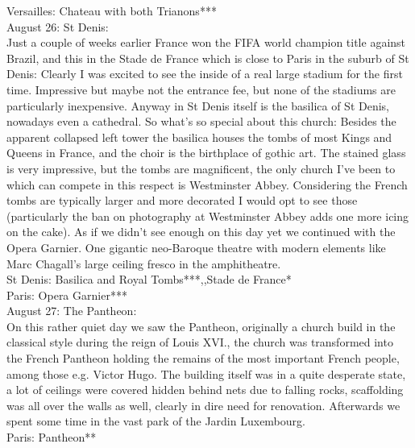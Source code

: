 Versailles: Chateau with both Trianons***\\

August 26: St Denis:\\
Just a couple of weeks earlier France won the FIFA world champion title against Brazil, and this in the Stade de France which is close to Paris in the suburb of St Denis: Clearly I was excited to see the inside of a real large stadium for the first time. Impressive but maybe not the entrance fee, but none of the stadiums are particularly inexpensive. Anyway in St Denis itself is the basilica of St Denis, nowadays even a cathedral. So what's so special about this church: Besides the apparent collapsed left tower the basilica houses the tombs of most Kings and Queens in France, and the choir is the birthplace of gothic art. The stained glass is very impressive, but the tombs are magnificent, the only church I've been to which can compete in this respect is Westminster Abbey. Considering the French tombs are typically larger and more decorated I would opt to see those (particularly the ban on photography at Westminster Abbey adds one more icing on the cake). As if we didn't see enough on this day yet we continued with the Opera Garnier. One gigantic neo-Baroque theatre with modern elements like Marc Chagall's large ceiling fresco in the amphitheatre.\\

St Denis: Basilica and Royal Tombs***,,Stade de France*\\
Paris: Opera Garnier***\\

August 27: The Pantheon:\\
On this rather quiet day we saw the Pantheon, originally a church build in the classical style during the reign of Louis XVI., the church was transformed into the French Pantheon holding the remains of the most important French people, among those e.g. Victor Hugo. The building itself was in a quite desperate state, a lot of ceilings were covered hidden behind nets due to falling rocks, scaffolding was all over the walls as well, clearly in dire need for renovation. Afterwards we spent some time in the vast park of the Jardin Luxembourg.\\

Paris: Pantheon**\\

